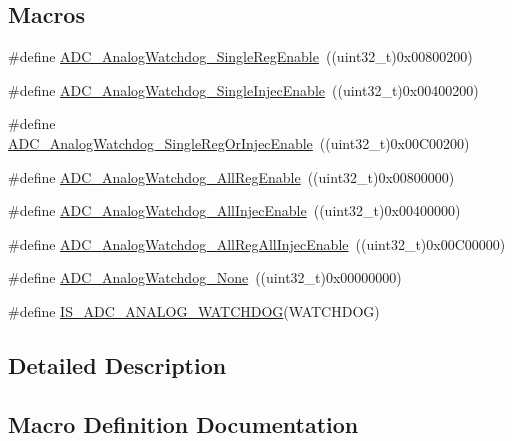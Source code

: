 \subsection*{Macros}
\begin{DoxyCompactItemize}
\item 
\#define \hyperlink{group___a_d_c__analog__watchdog__selection_ga2975552a752f44085d9da54b4e76121e}{A\+D\+C\+\_\+\+Analog\+Watchdog\+\_\+\+Single\+Reg\+Enable}~((uint32\+\_\+t)0x00800200)
\item 
\#define \hyperlink{group___a_d_c__analog__watchdog__selection_gaa9904271617ab69593ac68ae540047fb}{A\+D\+C\+\_\+\+Analog\+Watchdog\+\_\+\+Single\+Injec\+Enable}~((uint32\+\_\+t)0x00400200)
\item 
\#define \hyperlink{group___a_d_c__analog__watchdog__selection_gaffd35fc6ceb226ec3fb61fb52227820c}{A\+D\+C\+\_\+\+Analog\+Watchdog\+\_\+\+Single\+Reg\+Or\+Injec\+Enable}~((uint32\+\_\+t)0x00\+C00200)
\item 
\#define \hyperlink{group___a_d_c__analog__watchdog__selection_ga37f08e1a4a452a2c148341b3cfcdeb1e}{A\+D\+C\+\_\+\+Analog\+Watchdog\+\_\+\+All\+Reg\+Enable}~((uint32\+\_\+t)0x00800000)
\item 
\#define \hyperlink{group___a_d_c__analog__watchdog__selection_gae4d6a7ebb136d924f0c8bad2cbac0574}{A\+D\+C\+\_\+\+Analog\+Watchdog\+\_\+\+All\+Injec\+Enable}~((uint32\+\_\+t)0x00400000)
\item 
\#define \hyperlink{group___a_d_c__analog__watchdog__selection_ga25a299f4493aaae316521351198df084}{A\+D\+C\+\_\+\+Analog\+Watchdog\+\_\+\+All\+Reg\+All\+Injec\+Enable}~((uint32\+\_\+t)0x00\+C00000)
\item 
\#define \hyperlink{group___a_d_c__analog__watchdog__selection_ga91f69979e0e449fef5a8b225a21e3eb9}{A\+D\+C\+\_\+\+Analog\+Watchdog\+\_\+\+None}~((uint32\+\_\+t)0x00000000)
\item 
\#define \hyperlink{group___a_d_c__analog__watchdog__selection_ga53ffa30f756569194342bfba80165544}{I\+S\+\_\+\+A\+D\+C\+\_\+\+A\+N\+A\+L\+O\+G\+\_\+\+W\+A\+T\+C\+H\+D\+OG}(W\+A\+T\+C\+H\+D\+OG)
\end{DoxyCompactItemize}


\subsection{Detailed Description}


\subsection{Macro Definition Documentation}
\mbox{\label{group___a_d_c__analog__watchdog__selection_gae4d6a7ebb136d924f0c8bad2cbac0574}} 
